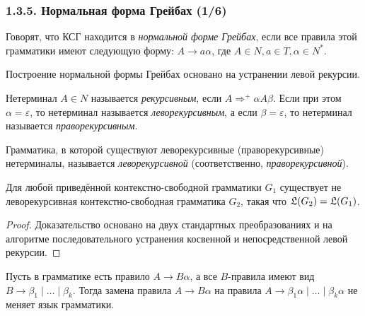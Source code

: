 \documentclass[mathserif,12pt,aspectratio=169]{beamer}
\renewcommand{\index}[1]{}
\def\odmkey#1#2{{\it\color{red} #1}\index{#2}}
\begin{document}
\begin{frame}
\frametitle{1.3.5. Нормальная форма Грейбах (1/6)}

Говорят, что КСГ находится в 
\odmkey{нормальной форме Грейбах}{Нормальная форма!Грейбах}, если все правила этой грамматики
имеют следующую форму: 
$A\to a\alpha$, где $A \in N, a\in T, \alpha\in N^*$. 

Построение нормальной формы Грейбах 
основано на устранении левой рекурсии.

Нетерминал $A\in N$ называется 
\odmkey{рекурсивным}{Нетерминал!рекурсивный},
если $A\Rightarrow^+\alpha A \beta$. 
Если при этом $\alpha =\varepsilon$, то
нетерминал называется 
\odmkey{леворекурсивным}{Нетерминал!леворекурсивный},
а если $\beta =\varepsilon$, то
нетерминал называется 
\odmkey{праворекурсивным}{Нетерминал!праворекурсивный}.

\medskip
Грамматика, в которой существуют леворекурсивные
(праворекурсивные) нетерминалы,
называется 
\odmkey{леворекурсивной}{Грамматика!леворекурсивная} (соответственно, \odmkey{праворекурсивной}{Грамматика!праворекурсивная}).

\begin{theorem}
Для любой приведённой контекстно-свободной грамматики $G_1$
существует не леворекурсивная контекстно-свободная грамматика $G_2$,
такая что  $\frak{L}(G_2)=\frak{L}(G_1)$.
\end{theorem}
\begin{proof}
Доказательство основано на двух стандартных преобразованиях и
на алгоритме последовательного устранения косвенной и непосредственной левой рекурсии.
\end{proof}

\begin{lemma}
Пусть в грамматике есть правило $A\to B\alpha$, а все $B$-правила имеют вид
$B\to \beta_1\mid \dots \mid \beta_k$.
Тогда замена правила $A\to B\alpha$ на правила
$A\to \beta_1\alpha \mid \dots \mid \beta_k\alpha$
не меняет язык грамматики.
\end{lemma}
\end{frame}
\end{document}
